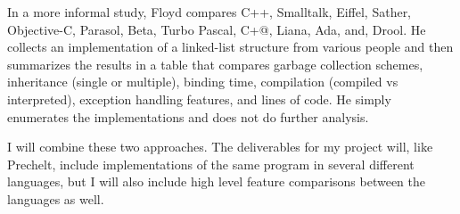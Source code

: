 \documentclass{article}
\begin{document}
In a more informal study, Floyd compares C++, Smalltalk, Eiffel, Sather,
Objective-C, Parasol, Beta, Turbo Pascal, C+@, Liana, Ada, and,
Drool\cite{DDJFloydeCompOOLangs}.  He collects an implementation of a
linked-list structure from various people and then summarizes the results in a
table that compares garbage collection schemes, inheritance (single or
multiple), binding time, compilation (compiled vs interpreted), exception
handling features, and lines of code.  He simply enumerates the implementations
and does not do further analysis.

I will combine these two approaches.  The deliverables for my project will,
like Prechelt, include implementations of the same program in several different
languages, but I will also include high level feature comparisons between the
languages as well.



\end{document}
